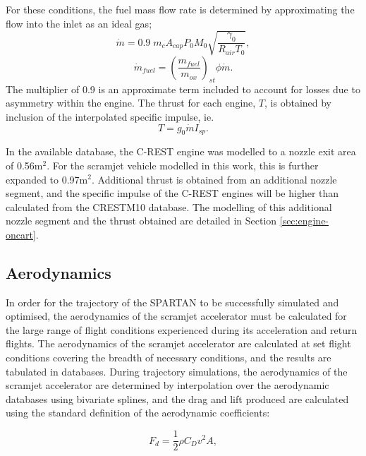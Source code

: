 For these conditions, the fuel mass flow rate is determined by approximating the flow into the inlet as an ideal gas; 
\begin{equation}
\dot{m} = 0.9 \; m_c A_{cap} P_0 M_0 \sqrt{\dfrac{\gamma_0}{R_{air} T_0}},
\end{equation}
\begin{equation}
\dot{m}_{fuel} = (\dfrac{m_{fuel}}{m_{ox}} )_{st} \phi \dot{m}.
\end{equation}
The multiplier of 0.9 is an approximate term included to account for losses due to asymmetry within the engine\cite{Preller2018a}. 
The thrust for each engine, $T$, is obtained by inclusion of the interpolated specific impulse, ie. 
\begin{equation}
T = g_0\dot{m}I_{sp}. 
\end{equation}

In the available database, the C-REST engine was modelled to a nozzle exit area of 0.56m$^2$. For the scramjet vehicle modelled in this work, this is further expanded to 0.97m$^2$. Additional thrust is obtained from an additional nozzle segment, and the specific impulse of the C-REST engines will be higher than calculated from the \textsf{CRESTM10} database. The modelling of this additional nozzle segment and the thrust obtained are detailed in Section \ref{sec:engine-oncart}.






		
		
		\subsection{Aerodynamics}\label{sec:aero}
		
		
		
In order for the trajectory of the SPARTAN to be successfully simulated and optimised, the aerodynamics of the scramjet accelerator must be calculated for the large range of flight conditions experienced during its acceleration and return flights. 
The aerodynamics of the scramjet accelerator are calculated at set flight conditions covering the breadth of necessary conditions, and the results are tabulated in databases. During trajectory simulations, the aerodynamics of the scramjet accelerator are determined by interpolation over the aerodynamic databases using bivariate splines, and the drag and lift produced are calculated using the standard definition of the aerodynamic coefficients:

\begin{equation}
F_d = \frac{1}{2}\rho C_D v^2 A ,
\end{equation}


